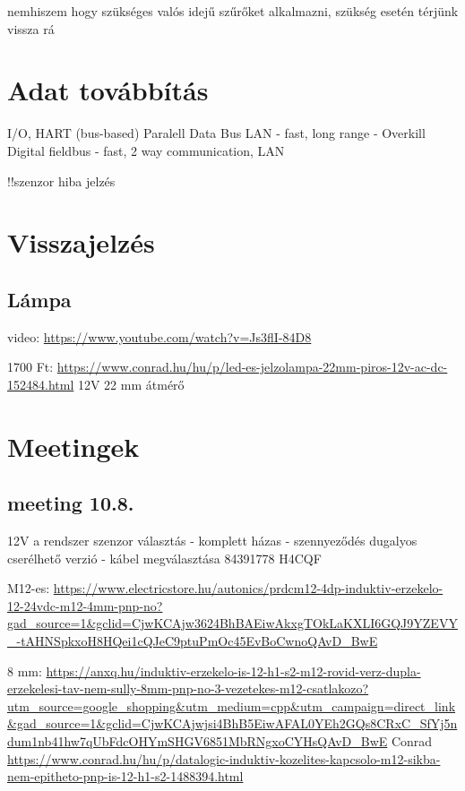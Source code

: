 \documentclass{article}
\begin{document}
	nemhiszem hogy szükséges valós idejű szűrőket alkalmazni, szükség esetén térjünk vissza rá
	
	\section{Adat továbbítás}
	
	I/O, HART (bus-based)
	Paralell Data Bus
	LAN - fast, long range - Overkill
	Digital fieldbus - fast, 2 way communication, LAN
	
	!!szenzor hiba jelzés
	
	\section{Visszajelzés}
	
	\subsection{Lámpa}
	
	video: \url{https://www.youtube.com/watch?v=Js3flI-84D8}

	1700 Ft: \url{https://www.conrad.hu/hu/p/led-es-jelzolampa-22mm-piros-12v-ac-dc-152484.html}
	12V
	22 mm átmérő
	
	
	\section{Meetingek}
	
	\subsection{meeting 10.8.}
	
	12V a rendszer
	szenzor választás - komplett házas - szennyeződés
	dugalyos cserélhető verzió - kábel megválasztása
	84391778 H4CQF
	
	M12-es: \url{https://www.electricstore.hu/autonics/prdcm12-4dp-induktiv-erzekelo-12-24vdc-m12-4mm-pnp-no?gad_source=1&gclid=CjwKCAjw3624BhBAEiwAkxgTOkLaKXLI6GQJ9YZEVY_-tAHNSpkxoH8HQei1cQJeC9ptuPmOc45EvBoCwnoQAvD_BwE}
	
	8 mm: \url{https://anxq.hu/induktiv-erzekelo-is-12-h1-s2-m12-rovid-verz-dupla-erzekelesi-tav-nem-sully-8mm-pnp-no-3-vezetekes-m12-csatlakozo?utm_source=google_shopping&utm_medium=cpp&utm_campaign=direct_link&gad_source=1&gclid=CjwKCAjwjsi4BhB5EiwAFAL0YEh2GQs8CRxC_SfYj5ndum1nb41hw7qUbFdcOHYmSHGV6851MbRNgxoCYHsQAvD_BwE}
	Conrad
	\url{https://www.conrad.hu/hu/p/datalogic-induktiv-kozelites-kapcsolo-m12-sikba-nem-epitheto-pnp-is-12-h1-s2-1488394.html}
	
\end{document}
